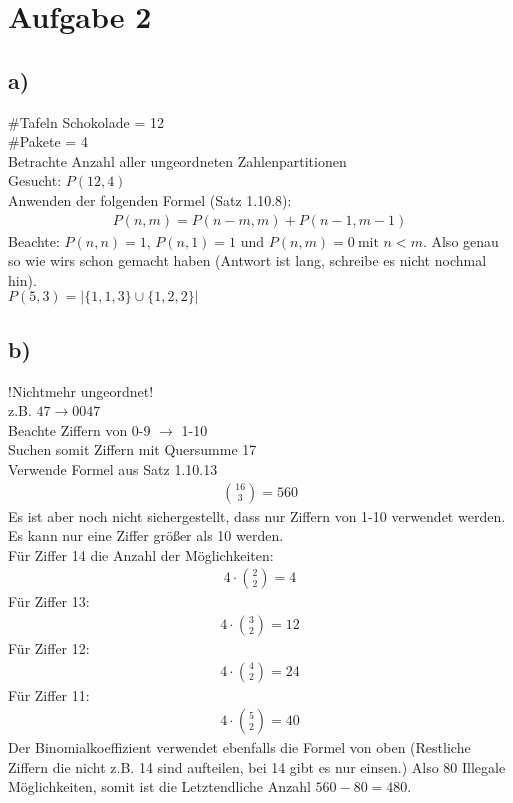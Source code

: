 \section*{Aufgabe 2}
\subsection*{a)}
\#Tafeln Schokolade = 12 \\
\#Pakete = 4 \\
Betrachte Anzahl aller ungeordneten Zahlenpartitionen \\
Gesucht: $ P(12,4) $\\
Anwenden der folgenden Formel (Satz 1.10.8):
\begin{align*}
  P(n,m) = P(n-m,m) + P(n-1,m-1)
\end{align*}
Beachte: $ P(n,n) = 1 $, $ P(n,1) = 1 $ und $ P(n,m) = 0\ \text{mit } n<m $.
Also genau so wie wirs schon gemacht haben (Antwort ist lang, schreibe es nicht nochmal hin). \\
$P(5,3) = |\{1,1,3\} \cup \{1,2,2\}|$
\pagebreak
\subsection*{b)}
!Nichtmehr ungeordnet!\\
z.B. $ 47 \rightarrow 0047 $ \\
Beachte Ziffern von 0-9 $\rightarrow$ 1-10 \\
Suchen somit Ziffern mit Quersumme 17 \\
Verwende Formel aus Satz 1.10.13 \\
\begin{align*}
  \binom{16}{3} = 560
\end{align*}
Es ist aber noch nicht sichergestellt, dass nur Ziffern von 1-10 verwendet werden.
Es kann nur eine Ziffer größer als 10 werden. \\
Für Ziffer 14 die Anzahl der Möglichkeiten:
\begin{align*}
  4\cdot \binom{2}{2} = 4
\end{align*}
Für Ziffer 13:
\begin{align*}
  4\cdot \binom{3}{2} = 12
\end{align*}
Für Ziffer 12:
\begin{align*}
  4\cdot \binom{4}{2} = 24
\end{align*}
Für Ziffer 11:
\begin{align*}
  4\cdot \binom{5}{2} = 40
\end{align*}
Der Binomialkoeffizient verwendet ebenfalls die Formel von oben (Restliche Ziffern die nicht z.B. 14 sind aufteilen, bei 14 gibt es nur einsen.)
Also 80 Illegale Möglichkeiten, somit ist die Letztendliche Anzahl $ 560 - 80 = 480 $.

